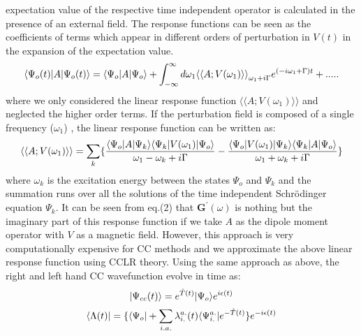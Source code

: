 expectation value of the respective time independent  operator is calculated in
the presence of an external field. The response functions can be seen as the
coefficients of terms which appear in different orders of perturbation in $V(t)$
in the expansion of the expectation value.\cite{Koch90} 
\begin{equation}
\langle \Psi_o(t) |A| \Psi_o(t) \rangle = \langle \Psi_o |A| \Psi_o \rangle + \int_{-\infty}^{\infty}d\omega_1{\langle\langle A;V({\omega_1})\rangle\rangle}_{\omega_1 + i\Gamma}e^{(-i\omega_1 + \Gamma)t} + .....
\end{equation}
where we only considered the linear response function $\langle\langle A;V({\omega_1})\rangle\rangle$ 
and neglected the higher order terms. If the perturbation field is composed of a 
single frequency ($\omega_1$) , the linear response function can be written as:
\begin{equation}
\langle\langle A;V({\omega_1})\rangle\rangle = \sum_k\{
\frac{\langle \Psi_o |A| \Psi_k \rangle\langle \Psi_k |V({\omega_1})| \Psi_o \rangle}{\omega_1
- \omega_k + i\Gamma}  -
\frac{\langle \Psi_o |V({\omega_1})| \Psi_k \rangle\langle \Psi_k |A| \Psi_o \rangle}{\omega_1 + \omega_k +
i\Gamma}\} \end{equation}
where $\omega_k$ is the excitation energy between the states $\Psi_o$ and $\Psi_k$ 
and the summation runs over all the solutions of the time independent Schr\"odinger equation $\Psi_k$.
It can be seen from eq.(2) that $\textbf{G}^{\prime}(\omega)$ is nothing but the imaginary part of this 
response function if we take $A$ as the dipole moment operator with $V$ as a magnetic field.
However, this approach is very computationally expensive for CC methods and we approximate the above 
linear response function using CCLR theory.
Using the same approach as above, the right and left hand CC wavefunction evolve in time as\cite{Koch90}:
\begin{equation}
| \Psi_{cc}(t) \rangle = e^{\hat{T}(t)}| \Psi_o \rangle e^{i\epsilon(t)}
\end{equation}
\begin{equation} \langle \Lambda(t) | = \{\langle \Psi_o | +
\sum_{i.a.}\lambda^{a.}_{i.}(t)\langle \Psi^{a.}_{i.} |e^{-\hat{T}(t)}\}e^{-i\epsilon(t)}
\end{equation}
